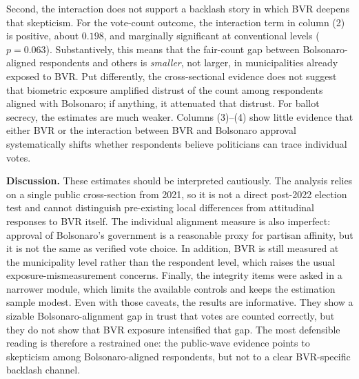 Second, the interaction does not support a backlash story in which BVR deepens that skepticism. For the vote-count outcome, the interaction term in column (2) is positive, about $0.198$, and marginally significant at conventional levels ($p=0.063$). Substantively, this means that the fair-count gap between Bolsonaro-aligned respondents and others is \emph{smaller}, not larger, in municipalities already exposed to BVR. Put differently, the cross-sectional evidence does not suggest that biometric exposure amplified distrust of the count among respondents aligned with Bolsonaro; if anything, it attenuated that distrust. For ballot secrecy, the estimates are much weaker. Columns (3)--(4) show little evidence that either BVR or the interaction between BVR and Bolsonaro approval systematically shifts whether respondents believe politicians can trace individual votes.

\textbf{Discussion.} These estimates should be interpreted cautiously. The analysis relies on a single public cross-section from 2021, so it is not a direct post-2022 election test and cannot distinguish pre-existing local differences from attitudinal responses to BVR itself. The individual alignment measure is also imperfect: approval of Bolsonaro's government is a reasonable proxy for partisan affinity, but it is not the same as verified vote choice. In addition, BVR is still measured at the municipality level rather than the respondent level, which raises the usual exposure-mismeasurement concerns. Finally, the integrity items were asked in a narrower module, which limits the available controls and keeps the estimation sample modest. Even with those caveats, the results are informative. They show a sizable Bolsonaro-alignment gap in trust that votes are counted correctly, but they do not show that BVR exposure intensified that gap. The most defensible reading is therefore a restrained one: the public-wave evidence points to skepticism among Bolsonaro-aligned respondents, but not to a clear BVR-specific backlash channel.
